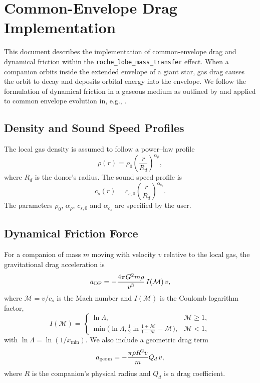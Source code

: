 \section{Common-Envelope Drag Implementation}
\label{sec:ce_drag}

This document describes the implementation of common-envelope drag and
dynamical friction within the \texttt{roche\_lobe\_mass\_transfer}
effect.  When a companion orbits inside the extended envelope of a giant
star, gas drag causes the orbit to decay and deposits orbital energy
into the envelope.  We follow the formulation of dynamical friction in a
gaseous medium as outlined by \citet{Ostriker1999} and applied to common
envelope evolution in, e.g., \citet{MacLeod2018}.

\subsection{Density and Sound Speed Profiles}
The local gas density is assumed to follow a power--law profile
\begin{equation}
  \rho(r) = \rho_0 \left(\frac{r}{R_d}\right)^{\alpha_\rho},
\end{equation}
where $R_d$ is the donor's radius.  The sound speed profile is
\begin{equation}
  c_s(r) = c_{s,0} \left(\frac{r}{R_d}\right)^{\alpha_{c_s}} .
\end{equation}
The parameters $\rho_0$, $\alpha_\rho$, $c_{s,0}$ and
$\alpha_{c_s}$ are specified by the user.

\subsection{Dynamical Friction Force}
For a companion of mass $m$ moving with velocity $v$ relative to the
local gas, the gravitational drag acceleration is
\begin{equation}
  a_{\rm DF} = - \frac{4\pi G^2 m \rho}{v^3} \, I(\mathcal{M}) \, v,\label{eq:df}
\end{equation}
where $\mathcal{M}=v/c_s$ is the Mach number and $I(\mathcal{M})$ is the
Coulomb logarithm factor,
\begin{equation}
  I(\mathcal{M}) =
  \begin{cases}
    \ln\Lambda, & \mathcal{M}\ge 1,\\
    \min\bigl(\ln\Lambda, \frac{1}{2}\ln\frac{1+\mathcal{M}}{1-\mathcal{M}}-\mathcal{M}\bigr), & \mathcal{M}<1,
  \end{cases}
\end{equation}
with $\ln\Lambda = \ln(1/x_{\min})$.  We also include a geometric drag
term
\begin{equation}
  a_{\rm geom} = - \frac{\pi \rho R^2 v}{m} Q_d \, v ,
\end{equation}
where $R$ is the companion's physical radius and $Q_d$ is a drag
coefficient.

